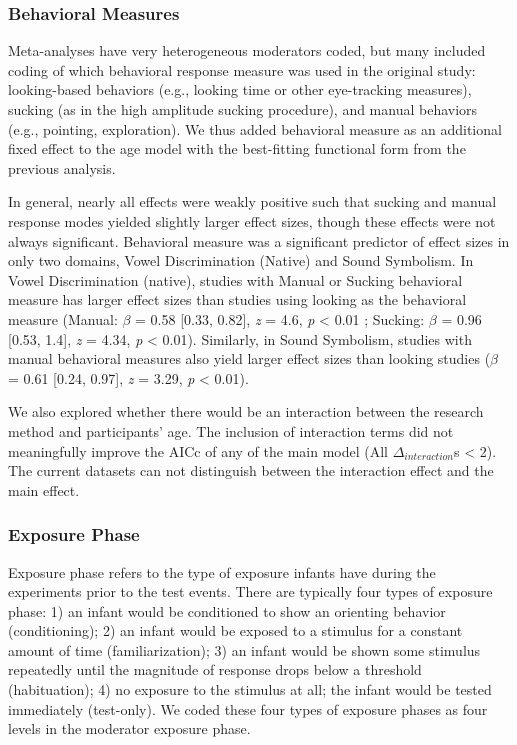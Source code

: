 \documentclass[10pt, letterpaper]{article}
\begin{document}
\hypertarget{behavioral-measures}{%
\subsubsection{Behavioral Measures}\label{behavioral-measures}}

Meta-analyses have very heterogeneous moderators coded, but many
included coding of which behavioral response measure was used in the
original study: looking-based behaviors (e.g., looking time or other
eye-tracking measures), sucking (as in the high amplitude sucking
procedure), and manual behaviors (e.g., pointing, exploration). We thus
added behavioral measure as an additional fixed effect to the age model
with the best-fitting functional form from the previous analysis.

In general, nearly all effects were weakly positive such that sucking
and manual response modes yielded slightly larger effect sizes, though
these effects were not always significant. Behavioral measure was a
significant predictor of effect sizes in only two domains, Vowel
Discrimination (Native) and Sound Symbolism. In Vowel Discrimination
(native), studies with Manual or Sucking behavioral measure has larger
effect sizes than studies using looking as the behavioral measure
(Manual: \(\beta\) = 0.58 {[}0.33, 0.82{]}, \emph{z} = 4.6, \emph{p}
\textless{} 0.01 ; Sucking: \(\beta\) = 0.96 {[}0.53, 1.4{]}, \emph{z} =
4.34, \emph{p} \textless{} 0.01). Similarly, in Sound Symbolism, studies
with manual behavioral measures also yield larger effect sizes than
looking studies (\(\beta\) = 0.61 {[}0.24, 0.97{]}, \emph{z} = 3.29,
\emph{p} \textless{} 0.01).

We also explored whether there would be an interaction between the
research method and participants' age. The inclusion of interaction
terms did not meaningfully improve the AICc of any of the main model
(All \(\Delta_{interaction}\)s \textless{} 2). The current datasets can
not distinguish between the interaction effect and the main effect.

\hypertarget{exposure-phase}{%
\subsubsection{Exposure Phase}\label{exposure-phase}}

Exposure phase refers to the type of exposure infants have during the
experiments prior to the test events. There are typically four types of
exposure phase: 1) an infant would be conditioned to show an orienting
behavior (conditioning); 2) an infant would be exposed to a stimulus for
a constant amount of time (familiarization); 3) an infant would be shown
some stimulus repeatedly until the magnitude of response drops below a
threshold (habituation); 4) no exposure to the stimulus at all; the
infant would be tested immediately (test-only). We coded these four
types of exposure phases as four levels in the moderator exposure phase.
\end{document}
